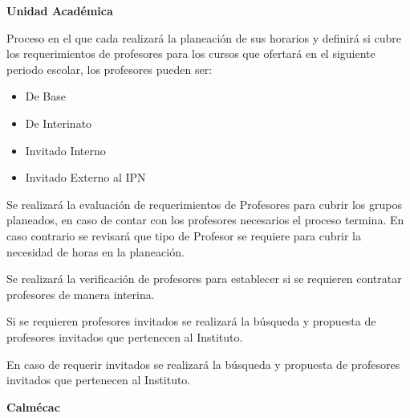 \begin{PDescripcion}
	
	
	\Ppaso \textbf{Unidad Académica}
	
	\begin{enumerate}
		
		\Ppaso[\PSubProceso]  Proceso en el que cada  realizará la planeación de sus horarios y definirá si cubre los requerimientos de profesores para los cursos que ofertará en el siguiente periodo escolar, los profesores pueden ser:
		
		\begin{itemize}
			\item De Base
			\item De Interinato
			\item Invitado Interno 
			\item Invitado Externo al IPN
		\end{itemize}
		
	    Se realizará la evaluación de requerimientos de Profesores para cubrir los grupos planeados, en caso de contar con los profesores necesarios el proceso termina. En caso contrario se revisará que tipo de Profesor se requiere para cubrir la necesidad de horas en la planeación.
		
		\Ppaso[\PSubProceso] Se realizará la verificación de profesores para establecer si se requieren contratar profesores de manera interina.
		
		\Ppaso[\PSubProceso] Si se requieren profesores invitados se realizará la búsqueda y propuesta de profesores invitados que pertenecen al Instituto.
		
		\Ppaso[\PSubProceso] En caso de requerir invitados se realizará la búsqueda y propuesta de profesores invitados que pertenecen al Instituto.
		
	\end{enumerate}
	
	
	\Ppaso \textbf{Calmécac}
	
	\begin{enumerate}
		

\end{enumerate}
\end{PDescripcion}
